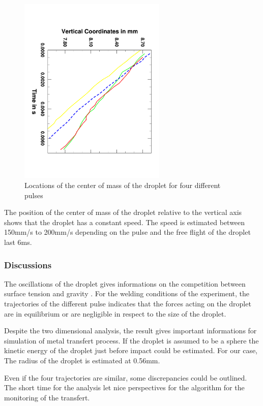 \documentclass[12pt]{iopart}
\begin{document}
\begin{figure}[h!]
\centering    
\includegraphics[width=7cm,angle=90]{images/Velocities.pdf}
\caption{Locations of the center of mass of the droplet for four different pulses}
\label{fig::velocities}
\end{figure}

The position of the center of mass of the droplet relative to the vertical axis shows that the 
droplet has a constant speed. The speed is estimated between 150mm/s to 200mm/s depending on the pulse
and the free flight of the droplet last 6ms.

\subsubsection{Discussions}
The oscillations of the droplet gives informations on the competition between surface tension and gravity
\cite{White}.
For the welding conditions of the experiment, the trajectories of the different pulse indicates 
that the forces acting on the droplet are in equilibrium
or are negligible in respect to the size of the droplet.

Despite the two dimensional analysis, the result gives important informations for 
simulation of metal transfert process. If  the droplet is assumed to be a sphere
 the kinetic energy of the droplet just before impact could be estimated. For our case,
The radius of the droplet is estimated at 0.56mm. %

Even if the four trajectories are similar, some discrepancies could be outlined. The short time 
for the analysis let nice perspectives for the algorithm for the monitoring of the transfert.
\end{document}
